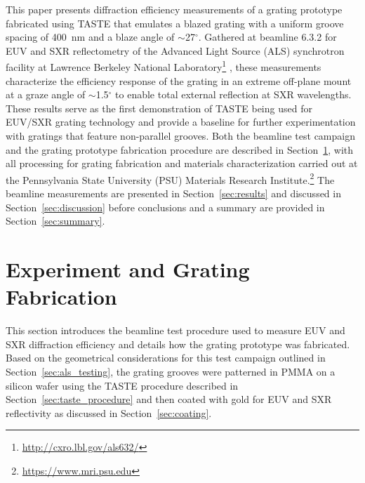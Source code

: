 \documentclass{aastex63}
\begin{document}
This paper presents diffraction efficiency measurements of a grating prototype fabricated using TASTE that emulates a blazed grating with a uniform groove spacing of 400~nm and a blaze angle of $\sim$27$^{\circ}$. 
Gathered at beamline 6.3.2 for EUV and SXR reflectometry of the Advanced Light Source (ALS) synchrotron facility at Lawrence Berkeley National Laboratory\footnote{\url{http://cxro.lbl.gov/als632/}} \citep{Underwood96,Gullikson01}, these measurements characterize the efficiency response of the grating in an extreme off-plane mount at a graze angle of $\sim$1.5$^{\circ}$ to enable total external reflection at SXR wavelengths. 
These results serve as the first demonstration of TASTE being used for EUV/SXR grating technology and provide a baseline for further experimentation with gratings that feature non-parallel grooves. 
Both the beamline test campaign and the grating prototype fabrication procedure are described in Section~\ref{sec:experiment}, with all processing for grating fabrication and materials characterization carried out at the Pennsylvania State University (PSU) Materials Research Institute.\footnote{\url{https://www.mri.psu.edu}} 
The beamline measurements are presented in Section~\ref{sec:results} and discussed in Section~\ref{sec:discussion} before conclusions and a summary are provided in Section~\ref{sec:summary}. 

\section{Experiment and Grating Fabrication}\label{sec:experiment}
This section introduces the beamline test procedure used to measure EUV and SXR diffraction efficiency and details how the grating prototype was fabricated. 
Based on the geometrical considerations for this test campaign outlined in Section~\ref{sec:als_testing}, the grating grooves were patterned in PMMA on a silicon wafer using the TASTE procedure described in Section~\ref{sec:taste_procedure} and then coated with gold for EUV and SXR reflectivity as discussed in Section~\ref{sec:coating}. 
\end{document}
